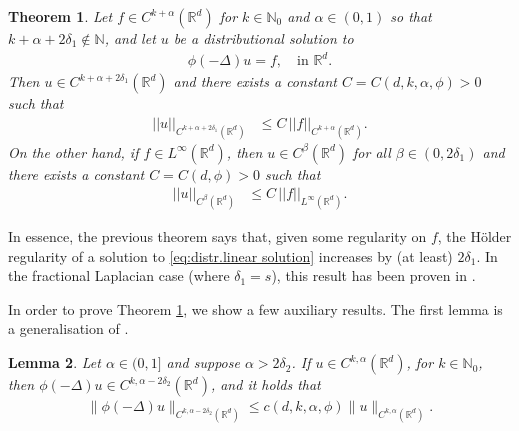 \documentclass[12pt,a4paper,onecolumn]{amsart}
\newtheorem{thm}{Theorem}[section]
\newtheorem{lem}[thm]{Lemma}
\theoremstyle{definition}
\newcommand{\R}{\mathbb{R}}
\newcommand{\N}{\mathbb{N}}
\newcommand{\1}{\mathbf 1}
\newcommand{\LoR}{\phi(-\Delta)}
\numberwithin{equation}{section}
\begin{document}
\begin{thm}\label{t:regularity SBM}
	Let $f\in C^{k+\alpha}(\R^d)$ for $k\in \N_0$ and $\alpha\in (0,1)$ so that $k+\alpha+2\delta_1\notin \N$, and let $u$ be a distributional solution to
	\begin{align}\label{eq:distr.linear solution}
		\LoR u=f,\quad \text{in $\R^d$}.
	\end{align} 
Then $u\in C^{k+\alpha+2\delta_1}(\R^d)$ and there exists a constant $C=C(d,k,\alpha,\phi)>0$ such that
    \begin{align}\label{eq:regularity SBM no1}
		||u||_{C^{k+\alpha+2\delta_1}(\R^d)}&\le C\,||f||_{C^{k+\alpha}(\R^d)}.
	\end{align}
	On the other hand, if $f\in L^\infty(\R^d)$, then $u\in C^{\beta}(\R^d)$ for all $\beta\in(0,2\delta_1)$ and there exists a constant $C=C(d,\phi)>0$ such that
	\begin{align}\label{eq:regularity SBM no2}
		||u||_{C^{\beta}(\R^d)}&\le C\,||f||_{L^\infty(\R^d)}.
	\end{align}
\end{thm}
In essence, the previous theorem says that, given some regularity on $f$, the H\"older regularity of a solution to \eqref{eq:distr.linear solution} increases by (at least) $2\delta_1$. In the fractional Laplacian case (where $\delta_1=s$), this result has been proven in \cite[Section 2.1]{Silvestre2007regularity}. 

In order to prove Theorem \ref{t:regularity SBM}, we show a few auxiliary results. The first lemma is a generalisation of \cite[Proposition 2.5]{Silvestre2007regularity}.

\begin{lem}\label{l:reg. 0,alpha}
	Let $\alpha\in(0,1]$ and suppose $\alpha>2\delta_2$. If $u\in C^{k,\alpha}(\R^d)$, for $k\in \N_0$, then $\LoR u\in C^{k,\alpha-2\delta_2}(\R^d)$, and it holds that
    \begin{align}\label{eq:reg. 0,alpha}
        \|\LoR u\|_{C^{k,\alpha-2\delta_2}(\R^d)}\le c(d,k,\alpha,\phi)\|u\|_{C^{k,\alpha}(\R^d)}. 
    \end{align}
\end{lem}
\end{document}
